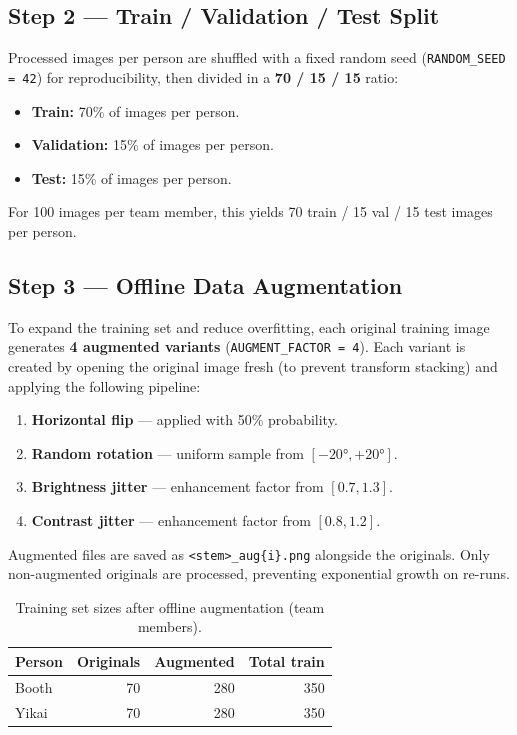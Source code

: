 \documentclass[12pt,a4paper]{article}
\begin{document}
\subsection{Step 2 — Train / Validation / Test Split}

Processed images per person are shuffled with a fixed random seed (\texttt{RANDOM\_SEED = 42}) for reproducibility, then divided in a \textbf{70 / 15 / 15} ratio:

\begin{itemize}[noitemsep]
  \item \textbf{Train:} 70\% of images per person.
  \item \textbf{Validation:} 15\% of images per person.
  \item \textbf{Test:} 15\% of images per person.
\end{itemize}

For 100 images per team member, this yields 70 train / 15 val / 15 test images per person.

\subsection{Step 3 — Offline Data Augmentation}

To expand the training set and reduce overfitting, each original training image generates \textbf{4 augmented variants} (\texttt{AUGMENT\_FACTOR = 4}). Each variant is created by opening the original image fresh (to prevent transform stacking) and applying the following pipeline:

\begin{enumerate}[noitemsep]
  \item \textbf{Horizontal flip} — applied with 50\% probability.
  \item \textbf{Random rotation} — uniform sample from $[-20°, +20°]$.
  \item \textbf{Brightness jitter} — enhancement factor from $[0.7, 1.3]$.
  \item \textbf{Contrast jitter} — enhancement factor from $[0.8, 1.2]$.
\end{enumerate}

Augmented files are saved as \texttt{<stem>\_aug\{i\}.png} alongside the originals. Only non-augmented originals are processed, preventing exponential growth on re-runs.

\begin{table}[H]
  \centering
  \begin{tabular}{lrrr}
    \toprule
    \textbf{Person} & \textbf{Originals} & \textbf{Augmented} & \textbf{Total train} \\
    \midrule
    Booth & 70 & 280 & 350 \\
    Yikai & 70 & 280 & 350 \\
    \bottomrule
  \end{tabular}
  \caption{Training set sizes after offline augmentation (team members).}
\end{table}
\end{document}
